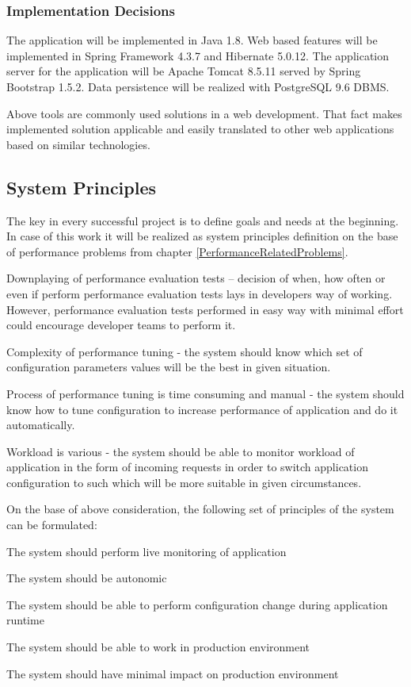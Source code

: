 \documentclass[12pt,a4paper]{article}
\let\tempone\itemize
\let\temptwo\enditemize
\renewenvironment{itemize}{\tempone\addtolength{\itemsep}{-0.4\baselineskip}}{\temptwo}
\begin{document}
\subsubsection{Implementation Decisions} 
The application will be implemented in Java 1.8. Web based features will be implemented in Spring Framework 4.3.7 and Hibernate 5.0.12. The application server for the application will be Apache Tomcat 8.5.11 served by Spring Bootstrap 1.5.2. Data persistence will be realized with PostgreSQL 9.6 DBMS.  

Above tools are commonly used solutions in a web development. That fact makes implemented solution applicable and easily translated to other web applications based on similar technologies.  

\subsection{System Principles} \label{principles}
The key in every successful project is to define goals and needs at the beginning.
In case of this work it will be realized as system principles definition on the base of  performance problems from chapter \ref{PerformanceRelatedProblems}.

Downplaying of performance evaluation tests -- decision of when, how often or even if perform performance evaluation tests lays in developers way of working. However, performance evaluation tests performed in easy way with minimal effort could encourage developer teams to perform it. 

Complexity of performance tuning - the system should know which set of configuration parameters values will be the best in given situation.  

Process of performance tuning is time consuming and manual - the system should know how to tune configuration to increase performance of application and do it automatically. 

Workload is various - the system should be able to monitor workload of application in the form of incoming requests in order to switch application configuration to such  which will be more suitable in given circumstances. 

On the base of above consideration, the following set of principles of the system can be formulated:

\begin{itemize}
\item The system should perform live monitoring of application
\item The system should be autonomic
\item The system should be able to perform configuration change during application runtime
\item The system should be able to work in production environment
\item The system should have minimal impact on production environment
\end{itemize}
\end{document}
